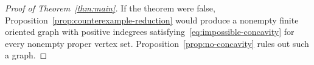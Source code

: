 \begin{proof}[Proof of Theorem~\ref{thm:main}]
If the theorem were false, Proposition~\ref{prop:counterexample-reduction}
would produce a nonempty finite oriented graph with positive indegrees
satisfying~\eqref{eq:impossible-concavity} for every nonempty proper vertex
set.  Proposition~\ref{prop:no-concavity} rules out such a graph.
\end{proof}
